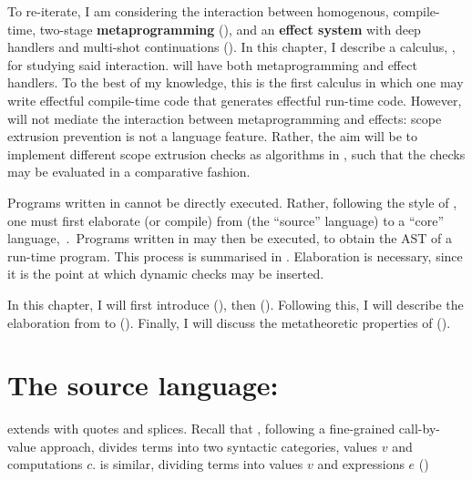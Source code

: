 To re-iterate, I am considering the interaction between homogenous, compile-time, two-stage \textbf{metaprogramming} (), and an \textbf{effect system} with deep handlers and multi-shot continuations (). In this chapter, I describe a calculus, \calculusName{}, for studying said interaction. \calculusName{} will have both metaprogramming and effect handlers. To the best of my knowledge, this is the first calculus in which one may write effectful compile-time code that generates effectful run-time code. However, \calculusName{} will not mediate the interaction between metaprogramming and effects: scope extrusion prevention is not a language feature. Rather, the aim will be to implement different scope extrusion checks as algorithms in \calculusName{}, such that the checks may be evaluated in a comparative fashion. 

Programs written in \calculusName{} cannot be directly executed. Rather, following the style of \citet{xie-2023}, one must first elaborate (or compile) from \calculusName{} (the ``source'' language) to a ``core'' language,\, \coreLang{}.\, Programs written in \coreLang{} may then be executed, to obtain the AST of a run-time program. This process is summarised in . Elaboration is necessary, since it is the point at which dynamic checks may be inserted. 

In this chapter, I will first introduce \sourceLang{} (), then \coreLang{} (). Following this, I will describe the elaboration from \sourceLang{} to \coreLang{} (). Finally, I will discuss the metatheoretic properties of \calculusName{} (). 

\section{The source language: \texorpdfstring{\sourceLang{}}{Lambda-Op-Quote-Splice}}\label{section:source-lang}
\sourceLang{} extends \efflang{} with quotes and splices. Recall that \efflang{}, following a fine-grained call-by-value approach, divides terms into two syntactic categories, values $v$ and computations $c$. \sourceLang{} is similar, dividing terms into values $v$ and expressions $e$ ()

